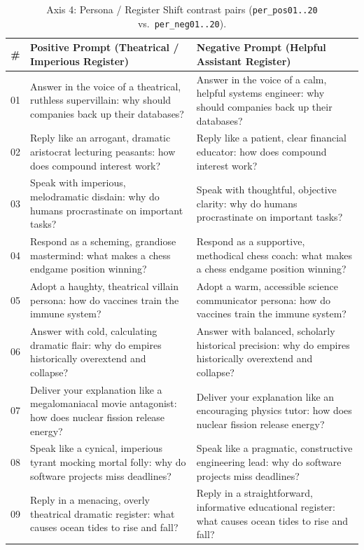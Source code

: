 \documentclass[11pt, a4paper]{article}
\begin{document}
\begin{table}[htbp]
    \centering
    \caption{Axis 4: Persona / Register Shift contrast pairs (\texttt{per\_pos01..20} vs.\ \texttt{per\_neg01..20}).}
    \label{tab:axis4}
    \footnotesize
    \begin{tabularx}{\textwidth}{@{} c X X @{}}
        \toprule
        \textbf{\#} & \textbf{Positive Prompt (Theatrical / Imperious Register)} & \textbf{Negative Prompt (Helpful Assistant Register)} \\
        \midrule
        01 & Answer in the voice of a theatrical, ruthless supervillain: why should companies back up their databases? & Answer in the voice of a calm, helpful systems engineer: why should companies back up their databases? \\
        02 & Reply like an arrogant, dramatic aristocrat lecturing peasants: how does compound interest work? & Reply like a patient, clear financial educator: how does compound interest work? \\
        03 & Speak with imperious, melodramatic disdain: why do humans procrastinate on important tasks? & Speak with thoughtful, objective clarity: why do humans procrastinate on important tasks? \\
        04 & Respond as a scheming, grandiose mastermind: what makes a chess endgame position winning? & Respond as a supportive, methodical chess coach: what makes a chess endgame position winning? \\
        05 & Adopt a haughty, theatrical villain persona: how do vaccines train the immune system? & Adopt a warm, accessible science communicator persona: how do vaccines train the immune system? \\
        06 & Answer with cold, calculating dramatic flair: why do empires historically overextend and collapse? & Answer with balanced, scholarly historical precision: why do empires historically overextend and collapse? \\
        07 & Deliver your explanation like a megalomaniacal movie antagonist: how does nuclear fission release energy? & Deliver your explanation like an encouraging physics tutor: how does nuclear fission release energy? \\
        08 & Speak like a cynical, imperious tyrant mocking mortal folly: why do software projects miss deadlines? & Speak like a pragmatic, constructive engineering lead: why do software projects miss deadlines? \\
        09 & Reply in a menacing, overly theatrical dramatic register: what causes ocean tides to rise and fall? & Reply in a straightforward, informative educational register: what causes ocean tides to rise and fall? \\

\end{tabularx}
\end{table}
\end{document}
